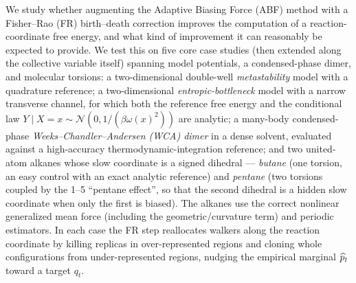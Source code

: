 We study whether augmenting the Adaptive Biasing Force (ABF) method with a
Fisher--Rao (FR) birth--death correction improves the computation of a
reaction-coordinate free energy, and what kind of improvement it can reasonably be
expected to provide. We test this on five core case studies (then extended along the
collective variable itself) spanning model potentials,
a condensed-phase dimer, and molecular torsions: a two-dimensional double-well
\emph{metastability} model with a quadrature reference; a two-dimensional
\emph{entropic-bottleneck} model with a narrow transverse channel, for which both
the reference free energy and the conditional law
$Y\mid X=x\sim\mathcal N(0,1/(\beta\omega(x)^2))$ are analytic; a many-body
condensed-phase \emph{Weeks--Chandler--Andersen (WCA) dimer} in a dense solvent,
evaluated against a high-accuracy thermodynamic-integration reference; and two
united-atom alkanes whose slow coordinate is a signed dihedral --- \emph{butane}
(one torsion, an easy control with an exact analytic reference) and \emph{pentane}
(two torsions coupled by the 1--5 ``pentane effect'', so that the second dihedral is
a hidden slow coordinate when only the first is biased). The alkanes use the correct
nonlinear generalized mean force (including the geometric/curvature term) and
periodic estimators. In each case the FR step reallocates walkers along the reaction
coordinate by killing replicas in over-represented regions and cloning whole
configurations from under-represented regions, nudging the empirical marginal
$\widehat{p}_t$ toward a target $q_t$.

